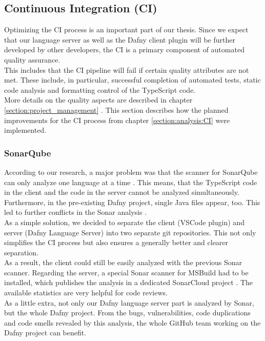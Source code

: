 \subsection{Continuous Integration (CI)}
Optimizing the CI process is an important part of our thesis.
Since we expect that our language server as well as the Dafny client plugin will be further developed by other developers,
the CI is a primary component of automated quality assurance. \\

This includes that the CI pipeline will fail if certain quality attributes are not met.
These include, in particular, successful completion of automated tests,
static code analysis and formatting control of the TypeScript code. \\

More details on the quality aspects are described in chapter
\ref{section:project_management} \textendash{} .
This section describes how the planned improvements for the CI process from chapter \ref{section:analysis:CI} were implemented.

\subsubsection{SonarQube}
According to our research, a major problem was that the scanner for SonarQube can only analyze one language at a time \cite{sonar-supports-only-one-language}.
This means, that the TypeScript code in the client and the \CsharpWithSpace code in the server cannot be analyzed simultaneously.
Furthermore, in the pre-existing Dafny project, single Java files appear, too.
This led to further conflicts in the Sonar analysis \cite{sa}.\\

As a simple solution, we decided to separate the client (VSCode plugin) and server (Dafny Language Server) into two separate git repositories.
This not only simplifies the CI process but also ensures a generally better and clearer separation. \\

As a result, the client could still be easily analyzed with the previous Sonar scanner.
Regarding the server, a special Sonar scanner for MSBuild had to be installed, which publishes the analysis in a dedicated SonarCloud project \cite{dev}.
The available statistics are very helpful for code reviews.\\

As a little extra, not only our Dafny language server part is analyzed by Sonar,
but the whole Dafny project.
From the bugs, vulnerabilities, code duplications and code smells revealed
by this analysis, the whole GitHub team working on the Dafny project can benefit. \\

